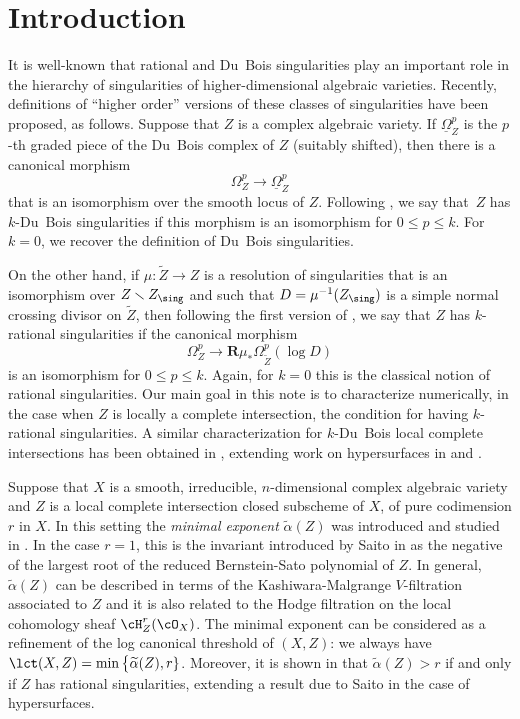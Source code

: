 \section{Introduction}

It is well-known that rational and Du~Bois singularities play an important role in the hierarchy of singularities of higher-dimensional algebraic varieties.
Recently, definitions of ``higher order'' versions of these classes of singularities have been proposed, as follows. Suppose that $Z$ is a complex algebraic variety.
If $\underline{\Omega}_Z^p$ is the $p$-th graded piece of the Du~Bois complex of $Z$ (suitably shifted), then there is a canonical morphism
\[\Omega_Z^p\to\underline{\Omega}_Z^p\]
that is an isomorphism over the smooth locus of $Z$. Following \cite{Saito_et_al}, we say that~$Z$ has $k$-Du~Bois singularities if this morphism is an isomorphism
for $0\leq p\leq k$. For $k=0$, we recover the definition of Du~Bois singularities.

On the other hand, if $\mu\colon\widetilde{Z}\to Z$ is a resolution of singularities that is an isomorphism over $Z\smallsetminus Z_\sing$
and such that $D=\mu^{-1}(Z_\sing)$ is a simple normal crossing divisor on $\widetilde{Z}$, then following the first version of \cite{FL1}, we say that $Z$ has
$k$-rational singularities if the canonical morphism
\[\Omega_Z^p\to {\mathbf R}\mu_*\Omega_{\widetilde{Z}}^p(\log D)\]
is an isomorphism for $0\leq p\leq k$. Again, for $k=0$ this is the classical notion of rational singularities.
Our main goal in this note is to characterize numerically, in the case when $Z$ is locally a complete intersection, the condition for having $k$-rational singularities.
A similar characterization for $k$-Du~Bois local complete intersections has been obtained in \cite{MP1}, extending work on hypersurfaces in \cite{MOPW}
and \cite{Saito_et_al}.

Suppose that $X$ is a smooth, irreducible, $n$-dimensional complex algebraic variety and $Z$ is a local complete intersection closed subscheme of $X$,
of pure codimension $r$ in $X$. In this setting the \emph{minimal exponent} $\widetilde{\alpha}(Z)$ was introduced and studied in \cite{CDMO}. In the case
$r=1$, this is the invariant introduced by Saito in \cite{Saito_microlocal} as the negative of the largest root of the reduced Bernstein-Sato polynomial of $Z$.
In general, $\widetilde{\alpha}(Z)$ can be described in terms of the Kashiwara-Malgrange $V$-filtration associated to $Z$ and it is also related to the Hodge filtration on the
local cohomology sheaf $\cH_Z^r(\cO_X)$. The minimal exponent can be considered as a refinement of the log canonical threshold of $(X,Z)$: we always have
$\lct(X,Z)=\min\big\{\widetilde{\alpha}(Z),r\}$. Moreover, it is shown in \cite{CDMO} that $\widetilde{\alpha}(Z)>r$ if and only if $Z$ has rational singularities,
extending a result due to Saito \cite{Saito-B} in the case of hypersurfaces.


